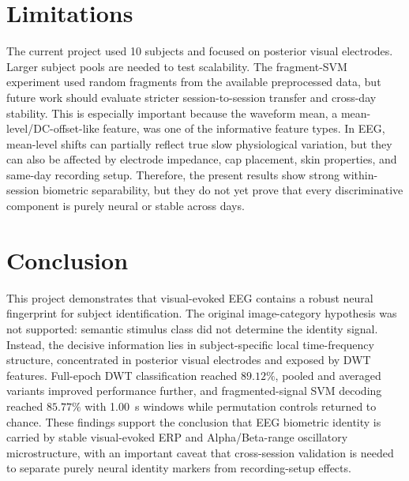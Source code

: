 \documentclass[11pt]{article}
\begin{document}
\section{Limitations}

The current project used 10 subjects and focused on posterior visual electrodes. Larger subject pools are needed to test scalability. The fragment-SVM experiment used random fragments from the available preprocessed data, but future work should evaluate stricter session-to-session transfer and cross-day stability. This is especially important because the waveform mean, a mean-level/DC-offset-like feature, was one of the informative feature types. In EEG, mean-level shifts can partially reflect true slow physiological variation, but they can also be affected by electrode impedance, cap placement, skin properties, and same-day recording setup. Therefore, the present results show strong within-session biometric separability, but they do not yet prove that every discriminative component is purely neural or stable across days.

\section{Conclusion}

This project demonstrates that visual-evoked EEG contains a robust neural fingerprint for subject identification. The original image-category hypothesis was not supported: semantic stimulus class did not determine the identity signal. Instead, the decisive information lies in subject-specific local time-frequency structure, concentrated in posterior visual electrodes and exposed by DWT features. Full-epoch DWT classification reached $89.12\%$, pooled and averaged variants improved performance further, and fragmented-signal SVM decoding reached $85.77\%$ with \SI{1.00}{s} windows while permutation controls returned to chance. These findings support the conclusion that EEG biometric identity is carried by stable visual-evoked ERP and Alpha/Beta-range oscillatory microstructure, with an important caveat that cross-session validation is needed to separate purely neural identity markers from recording-setup effects.
\end{document}
